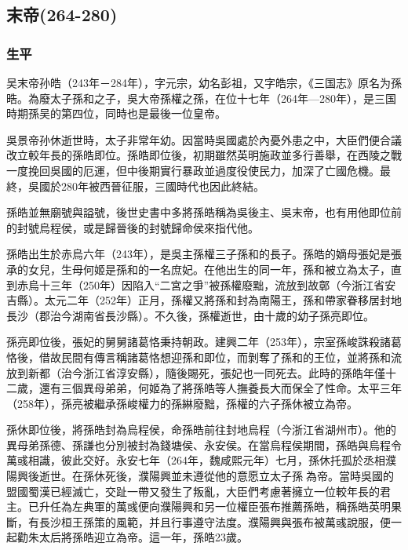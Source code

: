 
\subsection{末帝\tiny(264-280)}

\subsubsection{生平}

吴末帝孙皓（243年－284年），字元宗，幼名彭祖，又字皓宗，《三国志》原名为孫晧。為廢太子孫和之子，吳大帝孫權之孫，在位十七年（264年—280年），是三国時期孫吴的第四位，同時也是最後一位皇帝。

吳景帝孙休逝世時，太子非常年幼。因當時吳國處於內憂外患之中，大臣們便合議改立較年長的孫皓即位。孫皓即位後，初期雖然英明施政並多行善舉，在西陵之戰一度挽回吳國的厄運，但中後期實行暴政並過度役使民力，加深了亡國危機。最終，吳國於280年被西晉征服，三國時代也因此終結。

孫皓並無廟號與謚號，後世史書中多將孫皓稱為吳後主、吳末帝，也有用他即位前的封號烏程侯，或是歸晉後的封號歸命侯來指代他。

孫皓出生於赤烏六年（243年），是吳主孫權三子孫和的長子。孫皓的嫡母張妃是張承的女兒，生母何姬是孫和的一名庶妃。在他出生的同一年，孫和被立為太子，直到赤烏十三年（250年）因陷入“二宮之爭”被孫權廢黜，流放到故鄣（今浙江省安吉縣）。太元二年（252年）正月，孫權又將孫和封為南陽王，孫和帶家眷移居封地長沙（郡治今湖南省長沙縣）。不久後，孫權逝世，由十歲的幼子孫亮即位。

孫亮即位後，張妃的舅舅諸葛恪秉持朝政。建興二年（253年），宗室孫峻誅殺諸葛恪後，借故民間有傳言稱諸葛恪想迎孫和即位，而剝奪了孫和的王位，並將孫和流放到新都（治今浙江省淳安縣），隨後賜死，張妃也一同死去。此時的孫皓年僅十二歲，還有三個異母弟弟，何姬為了將孫皓等人撫養長大而保全了性命。太平三年（258年），孫亮被繼承孫峻權力的孫綝廢黜，孫權的六子孫休被立為帝。

孫休即位後，將孫皓封為烏程侯，命孫皓前往封地烏程（今浙江省湖州市）。他的異母弟孫德、孫謙也分別被封為錢塘侯、永安侯。在當烏程侯期間，孫皓與烏程令萬彧相識，彼此交好。永安七年（264年，魏咸熙元年）七月，孫休托孤於丞相濮陽興後逝世。在孫休死後，濮陽興並未遵從他的意愿立太子孫𩅦為帝。當時吳國的盟國蜀漢已經滅亡，交趾一帶又發生了叛亂，大臣們考慮著擁立一位較年長的君主。已升任為左典軍的萬彧便向濮陽興和另一位權臣張布推薦孫皓，稱孫皓英明果斷，有長沙桓王孫策的風範，并且行事遵守法度。濮陽興與張布被萬彧說服，便一起勸朱太后將孫皓迎立為帝。這一年，孫皓23歲。

